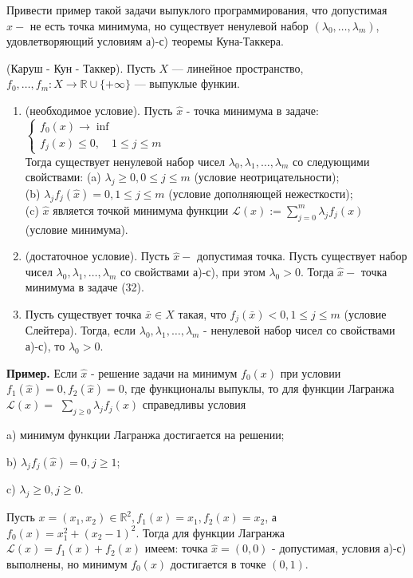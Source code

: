 \begin{task}
Привести пример такой задачи выпуклого программирования, что допустимая $\hat{x}-$ не есть точка минимума, но существует ненулевой набор $\left(\lambda_{0}, \ldots, \lambda_{m}\right)$, удовлетворяющий условиям а)-с) теоремы Куна-Таккера.

\begin{theorem}
    (Каруш - Кун - Таккер). Пусть $X$ --- линейное пространство, $f_0, \ldots, f_m: X \rightarrow \mathbb{R} \cup\{+\infty\}$ --- выпуклые функии.
    \begin{enumerate}
        \item (необходимое условие). Пусть $\hat{x}$ - точка минимума в задаче: 
            \\
            $\left\{\begin{array}{l}f_0(x) \rightarrow \inf \\ f_j(x) \leq 0, \quad 1 \leq j \leq m\end{array}\right.$
            \\
        Тогда существует ненулевой набор чисел $\lambda_0, \lambda_1, \ldots, \lambda_m$ со следующими свойствами:
            (a) $\lambda_j \geq 0,0 \leq j \leq m$ (условие неотрицательности); \\
            (b) $\lambda_j f_j(\hat{x})=0, 1 \leq j \leq m$ (условие дополняющей нежесткости); \\
            (c) $\hat{x}$ является точкой минимума функции $\mathcal{L}(x):=\sum_{j=0}^m \lambda_j f_j(x)$ (условие минимума). \\
        \item (достаточное условие). Пусть $\hat{x}-$ допустимая точка. Пусть существует набор чисел $\lambda_0, \lambda_1, \ldots, \lambda_m$ 
            со свойствами а)-с), при этом $\lambda_0>0$. Тогда $\hat{x}-$ точка минимума в задаче (32).
        \item Пусть существует точка $\bar{x} \in X$ такая, что $f_j(\bar{x})<0,1 \leq j \leq m$ (условие Слейтера). 
        Тогда, если $\lambda_0, \lambda_1, \ldots, \lambda_m$ - ненулевой набор чисел со свойствами а)-с), то $\lambda_0>0$.
    \end{enumerate}
\end{theorem}

\textbf{Пример.}
Если $\hat{x}$ - решение задачи на минимум $f_{0}(x)$ при условии $f_{1}(\hat{x})=0, f_{2}(\hat{x})=0$, где функционалы выпуклы, то для функции Лагранжа $\mathcal{L}(x)=$ $\sum_{j \geq 0} \lambda_{j} f_{j}(x)$ справедливы условия

a) минимум функции Лагранжа достигается на решении;

b) $\lambda_{j} f_{j}(\hat{x})=0, j \geq 1$;

c) $\lambda_{j} \geq 0, j \geq 0$.

Пусть $x=\left(x_{1}, x_{2}\right) \in \mathbb{R}^{2}, f_{1}(x)=x_{1}, f_{2}(x)=x_{2}$, а $f_{0}(x)=x_{1}^{2}+\left(x_{2}-1\right)^{2}$. Тогда для функции Лагранжа $\mathcal{L}(x)=f_{1}(x)+f_{2}(x)$ имеем: точка $\hat{x}=(0,0)$ - допустимая, условия а)-с) выполнены, но минимум $f_{0}(x)$ достигается в точке $(0,1)$.


\end{task}
